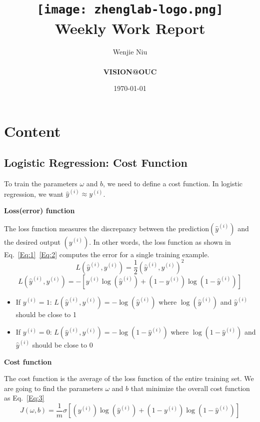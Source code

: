 \documentclass[a4paper]{article}
\title{
    \vspace*{1in}
    \texttt{[image: zhenglab-logo.png]} \\
    \vspace*{1.2in}
    \textbf{\huge Weekly Work Report}
    \vspace{0.2in}
}
\author{Wenjie Niu \\
    \vspace*{0.5in} \\
    \textbf{VISION@OUC} \\
    \vspace*{1in}
}
\date{\today}
\begin{document}
\maketitle
\setcounter{page}{0}
\thispagestyle{empty}
\newpage


\section{Content}
\subsection{Logistic Regression: Cost Function}
To train the parameters $\omega$ and $b$, we need to define a cost function. In logistic regression, we want $\hat{y}^{(i)} \approx y^{(i)}$.\par
\textbf{Loss(error) function}\par
The loss function measures the discrepancy between the prediction$(\hat{y}^{(i)})$ and the desired output $(y^{(i)})$. In other words, the loss function as shown in Eq.~\ref{Eq:1}~\ref{Eq:2} computes the error for a single training example.
\begin{equation}
L(\hat{y}^{(i)},y^{(i)})=\frac{1}{2}(\hat{y}^{(i)},y^{(i)})^2
\label{Eq:1}
\end{equation}
\begin{equation}
L(\hat{y}^{(i)},y^{(i)})=-[y^{(i)}\log(\hat{y}^{(i)})+(1-y^{(i)})\log(1-\hat{y}^{(i)})]
\label{Eq:2}
\end{equation}
\begin{itemize}
\item If $y^{(i)}=1$: $L(\hat{y}^{(i)},y^{(i)})=-\log(\hat{y}^{(i)})$ where $\log(\hat{y}^{(i)})$ and $\hat{y}^{(i)}$ should be close to 1
\item If $y^{(i)}=0$: $L(\hat{y}^{(i)},y^{(i)})=-\log(1-\hat{y}^{(i)})$ where $\log(1-\hat{y}^{(i)})$ and $\hat{y}^{(i)}$ should be close to 0
\end{itemize}

\textbf{Cost function}\par
The cost function is the average of the loss function of the entire training set. We are going to find the parameters $\omega$ and $b$ that minimize the overall cost function as Eq.~\ref{Eq:3}
\begin{equation}
J(\omega,b)=\frac{1}{m}\sigma[(y^{(i)})\log(\hat{y}^{(i)})+(1-y^{(i)})\log(1-\hat{y}^{(i)})]
\label{Eq:3}
\end{equation}
\end{document}
